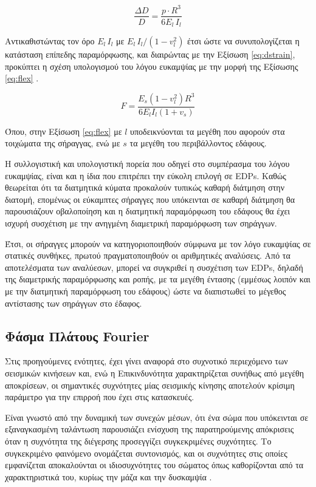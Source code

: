 \begin{equation}
	\frac{\Delta D}{D} = \frac{p\cdot R^3}{6E_l\,I_l}
	\label{eq:dstrain2}
\end{equation}

Αντικαθιστώντας τον όρο $E_l\,I_l$ με $E_l\,I_l/(1-v_l^2)$ έτσι ώστε να συνυπολογίζεται η κατάσταση επίπεδης παραμόρφωσης, και διαιρώντας με την Εξίσωση \ref{eq:dstrain}, προκύπτει η σχέση υπολογισμού του λόγου ευκαμψίας με την μορφή της Εξίσωσης \ref{eq:flex} \parencite{Peck}.

\begin{equation}
	F = \frac{E_s(1-v_l^2)R^3}{6E_l I_l(1+v_s)}
	\label{eq:flex}
\end{equation}

Όπου, στην Εξίσωση \ref{eq:flex} με $l$ υποδεικνύονται τα μεγέθη που αφορούν στα τοιχώματα της σήραγγας, ενώ με $s$ τα μεγέθη του περιβάλλοντος εδάφους.

Η συλλογιστική και υπολογιστική πορεία που οδηγεί στο συμπέρασμα του λόγου ευκαμψίας, είναι και η ίδια που επιτρέπει την εύκολη επιλογή σε EDPs. Καθώς θεωρείται ότι τα διατμητικά κύματα προκαλούν τυπικώς καθαρή διάτμηση στην διατομή, επομένως οι εύκαμπτες σήραγγες που υπόκεινται σε καθαρή διάτμηση θα παρουσιάζουν οβαλοποίηση και η διατμητική παραμόρφωση του εδάφους θα έχει ισχυρή συσχέτιση με την ανηγμένη διαμετρική παραμόρφωση των σηράγγων.

Έτσι, οι σήραγγες μπορούν να κατηγοριοποιηθούν σύμφωνα με τον λόγο ευκαμψίας σε στατικές συνθήκες, πρωτού πραγματοποιηθούν οι αριθμητικές αναλύσεις. Από τα αποτελέσματα των αναλύεσων, μπορεί να συγκριθεί η συσχέτιση των EDPs, δηλαδή της διαμετρικής παραμόρφωσης και ροπής, με τα μεγέθη έντασης (εμμέσως λοιπόν και με την διατμητική παραμόρφωση του εδάφους) ώστε να διαπιστωθεί το μέγεθος αντίστασης των σηράγγων στο έδαφος.


\subsection{Φάσμα Πλάτους Fourier}
Στις προηγούμενες ενότητες, έχει γίνει αναφορά στο συχνοτικό περιεχόμενο των σεισμικών κινήσεων και, ενώ η Επικινδυνότητα χαρακτηρίζεται συνήθως από μεγέθη αποκρίσεων, οι σημαντικές συχνότητες μίας σεισμικής κίνησης αποτελούν κρίσιμη παράμετρο για την επιρροή που έχει στις κατασκευές.

Είναι γνωστό από την δυναμική των συνεχών μέσων, ότι ένα σώμα που υπόκεινται σε εξαναγκασμένη ταλάντωση παρουσιάζει ενίσχυση της παρατηρούμενης απόκρισεις όταν η συχνότητα της διέγερσης προσεγγίζει συγκεκριμένες συχνότητες. Το συγκεκριμένο φαινόμενο ονομάζεται συντονισμός, και οι συχνότητες στις οποίες εμφανίζεται αποκαλούνται οι ιδιοσυχνότητες του σώματος όπως καθορίζονται από τα χαρακτηριστικά του, κυρίως την μάζα και την δυσκαμψία \parencite{Clough}. %

